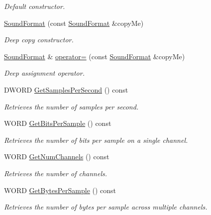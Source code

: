 \begin{DoxyCompactItemize}
\begin{DoxyCompactList}\small\item\em Default constructor. \item\end{DoxyCompactList}\item 
\hyperlink{class_sound_format_a02ff51fc93ebc1d1040e190add734648}{SoundFormat} (const \hyperlink{class_sound_format}{SoundFormat} \&copyMe)
\begin{DoxyCompactList}\small\item\em Deep copy constructor. \item\end{DoxyCompactList}\item 
\hyperlink{class_sound_format}{SoundFormat} \& \hyperlink{class_sound_format_a39d0818ec97f02381264cca56a5ebc9c}{operator=} (const \hyperlink{class_sound_format}{SoundFormat} \&copyMe)
\begin{DoxyCompactList}\small\item\em Deep assignment operator. \item\end{DoxyCompactList}\item 
DWORD \hyperlink{class_sound_format_a17d2e194156dd85e09c50936e9007d31}{GetSamplesPerSecond} () const 
\begin{DoxyCompactList}\small\item\em Retrieves the number of samples per second. \item\end{DoxyCompactList}\item 
WORD \hyperlink{class_sound_format_af88dbb10b2e23b0af59a81749bfb6f53}{GetBitsPerSample} () const 
\begin{DoxyCompactList}\small\item\em Retrieves the number of bits per sample on a single channel. \item\end{DoxyCompactList}\item 
WORD \hyperlink{class_sound_format_a9d7036ee215ffe0f645fb6aceb635f3d}{GetNumChannels} () const 
\begin{DoxyCompactList}\small\item\em Retrieves the number of channels. \item\end{DoxyCompactList}\item 
WORD \hyperlink{class_sound_format_a8472536ea648d1204495ab5ada1d8329}{GetBytesPerSample} () const 
\begin{DoxyCompactList}\small\item\em Retrieves the number of bytes per sample across multiple channels. \item\end{DoxyCompactList}\item 

\end{DoxyCompactItemize}
